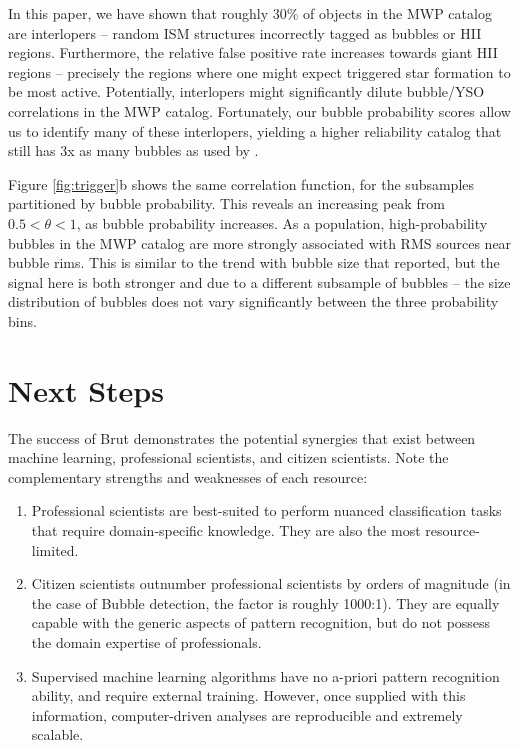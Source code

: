 \documentclass[preprint]{aastex}
\begin{document}
In this paper, we have shown that roughly 30\% of objects in the MWP catalog are interlopers -- random ISM structures incorrectly tagged as bubbles or HII regions. Furthermore, the relative false positive rate increases towards giant HII regions -- precisely the regions where one might expect triggered star formation to be most active. Potentially, interlopers might significantly dilute bubble/YSO correlations in the MWP catalog. Fortunately, our bubble probability scores allow us to identify many of these interlopers, yielding a higher reliability catalog that still has 3x as many bubbles as used by \cite{Thompson12}.

Figure \ref{fig:trigger}b shows the same correlation function, for the subsamples partitioned by bubble probability. This reveals an increasing peak from $0.5 < \theta < 1$, as bubble probability increases. As a population, high-probability bubbles in the MWP catalog are more strongly associated with RMS sources near bubble rims. This is similar to the trend with bubble size that \cite{Kendrew12} reported, but the signal here is both stronger and due to a different subsample of bubbles -- the size distribution of bubbles does not vary significantly between the three probability bins.

\section{Next Steps}
\label{sec:next_steps}
The success of Brut demonstrates the potential synergies that exist between machine learning, professional scientists, and citizen scientists. Note the complementary strengths and weaknesses of each resource:

\begin{enumerate}
\item Professional scientists are best-suited to perform nuanced classification tasks that require domain-specific knowledge. They are also the most resource-limited. 
\item Citizen scientists outnumber professional scientists by orders of magnitude (in the case of Bubble detection, the factor is roughly 1000:1). They are equally capable with the generic aspects of pattern recognition, but do not possess the domain expertise of professionals.
\item Supervised machine learning algorithms have no a-priori pattern recognition ability, and require external training. However, once supplied with this information, computer-driven analyses are reproducible and extremely scalable.
\end{enumerate}
\end{document}
